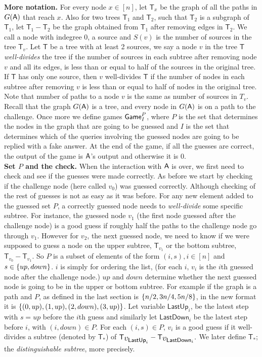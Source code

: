 \documentclass{article}
\def\A{{\sf A}}
\newcommand{\game}{{\sf Game}}
\newcommand{\T}{{\mathsf T}}
\newcommand{\lastup}{{\mathsf {LastUp}}}
\newcommand{\lastdown}{{\mathsf {LastDown}}}
\newcommand{\gpi}{$\game^P_I$}
\newcommand{\bigv}[1]{\mbox{\large $v_{#1}$}}
\begin{document}
  \textbf{More notation.} For every node $x\in [n]$, let $\T_x$ be the graph of all the paths in $G(\A)$ that reach $x$. Also for two trees $\T_1$ and $\T_2$, such that $\T_2$ is a subgraph of $\T_1$, let $\T_1-\T_2$ be the graph obtained from $\T_1$ after removing edges in $\T_2$. We call a node with indegree 0, a source and $S(v)$ is the number of sources in the tree $\T_v$.  Let $\T$ be a tree with at least 2 sources, we say a node $v$ in the tree $\T$ \textit{well-divides} the tree if the number of sources in each subtree after removing node $v$ and all its edges, is less than or equal to half of the sources in the original tree. If $\T$ has only one source, then $v$ well-divides $\T$ if the number of nodes in each subtree after removing $v$ is less than or equal to half of nodes in the original tree. Note that number of paths to a node $v$ is the same as number of sources in $T_v$.\\

  Recall that the graph $G(\A)$ is a tree, and every node in $G(\A)$ is on a path to the challenge. Once more we define games \gpi, where $P$ is the set that determines the nodes in the graph that are going to be guessed and $I$ is the set that determines which of the queries involving the guessed nodes are going to be replied with a fake answer. At the end of the game, if all the guesses are correct, the output of the game is $\A$'s output and otherwise it is 0.\\

  \textbf{Set $P$ and the check.} When the interaction with $\A$ is over, we first need to check and see if the guesses were made correctly. As before we start by checking if the challenge node (here called $v_0$) was guessed correctly. Although checking of the rest of guesses is not as easy as it was before. For any new element added to the guessed set $P$, a correctly guessed node needs to \textit{well-divide} some specific subtree. For instance, the guessed node $v_1$ (the first node guessed after the challenge node) is a good guess if roughly half the paths to the challenge node go through $v_1$. However for $v_2$, the next guessed node, we need to know if we were supposed to guess a node on the upper subtree, $\T_{v_1}$ or the bottom subtree, $\T_{v_0}-\T_{v_1}$. So $P$ is a subset of elements of the form $(i,s), i\in [n]$ and $s \in \left\{ up,down \right\}$. $i$ is simply for ordering the list, (for each $i$, $v_i$ is the $i$th guessed node after the challenge node.) $up$ and $down$ determine whether the next guessed node is going to be in the upper or bottom subtree. For example if the graph is a path and $P$, as defined in the last section is $\left\{ n/2,3n/4,5n/8 \right\}$, in the new format it is $\left\{ (0,up),(1,up), (2,down), (3,up) \right\}$. Let variable $\lastup_i$, be the latest step with $s=up$ before the $i$th guess and similarly let $\lastdown_i$ be the latest step before $i$, with $(i,down)\in P$. For each $(i,s)\in P$, $v_i$ is a good guess if it well-divides a subtree (denoted by $\T_*$) of $\T_{\bigv{\lastup_i}}- \T_{\bigv{\lastdown_i}}.$ We later define $\T_*$; the \textit{distinguishable subtree}, more precisely. \\
  
\end{document}
